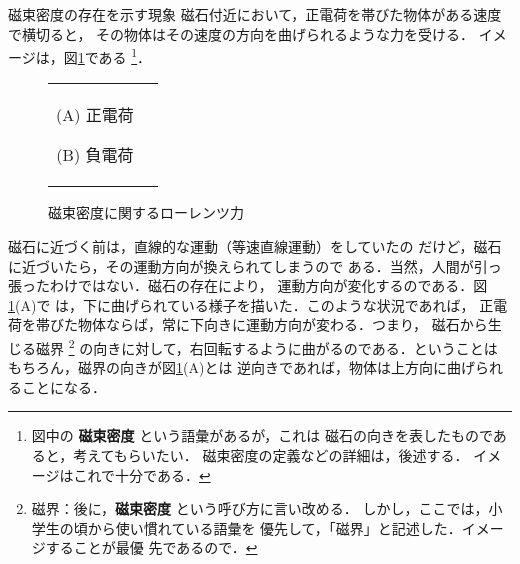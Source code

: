    \begin{mysmallsec}{磁束密度の存在を示す現象}
        磁石付近において，正電荷を帯びた物体がある速度で横切ると，
        その物体はその速度の方向を曲げられるような力を受ける．
        イメージは，図\ref{fig:Lorentz_Force_image}である
            \footnote{
                図中の \textbf{磁束密度} という語彙があるが，これは
                磁石の向きを表したものであると，考えてもらいたい．
                磁束密度の定義などの詳細は，後述する．
                イメージはこれで十分である．
            }．
        \begin{figure}[hbt]
            \begin{tabular}{cc}
                \begin{minipage}{0.5\hsize}
                    \begin{center}
                        {Lorentz_Force_image1.pdf}

                        (A) 正電荷
                    \end{center}
                \end{minipage}
                \begin{minipage}{0.5\hsize}
                    \begin{center}
                        {Lorentz_Force_image2.pdf}

                        (B) 負電荷
                    \end{center}
                \end{minipage}
            \end{tabular}
                        \caption{磁束密度に関するローレンツ力}
                        \label{fig:Lorentz_Force_image}
        \end{figure}

        磁石に近づく前は，直線的な運動（等速直線運動）をしていたの
        だけど，磁石に近づいたら，その運動方向が換えられてしまうので
        ある．当然，人間が引っ張ったわけではない．磁石の存在により，
        運動方向が変化するのである．図\ref{fig:Lorentz_Force_image}(A)で
        は，下に曲げられている様子を描いた．このような状況であれば，
        正電荷を帯びた物体ならば，常に下向きに運動方向が変わる．つまり，
        磁石から生じる磁界
            \footnote{
                磁界：後に，\textbf{磁束密度} という呼び方に言い改める．
                しかし，ここでは，小学生の頃から使い慣れている語彙を
                優先して，「磁界」と記述した．イメージすることが最優
                先であるので．
            }
        の向きに対して，右回転するように曲がるのである．ということは
        もちろん，磁界の向きが図\ref{fig:Lorentz_Force_image}(A)とは
        逆向きであれば，物体は上方向に曲げられることになる．


\end{mysmallsec}
